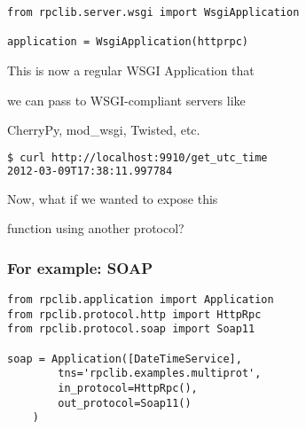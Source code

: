 \documentclass{beamer}
\begin{document}
\begin{frame}[fragile]
 \begin{lstlisting}
from rpclib.server.wsgi import WsgiApplication

application = WsgiApplication(httprpc)
 \end{lstlisting}

  \begin{center}
    This is now a regular WSGI Application that

    \bigskip

    we can pass to WSGI-compliant servers like

    \bigskip

    CherryPy, mod\_wsgi, Twisted, etc.
  \end{center}
  \pause
  \begin{lstlisting}[language=sh]
$ curl http://localhost:9910/get_utc_time
2012-03-09T17:38:11.997784
  \end{lstlisting}
\end{frame}

\begin{frame}
  \LARGE
  \begin{center}
    Now, what if we wanted to expose this

    \bigskip

    function using another protocol?
  \end{center}
\end{frame}

\begin{frame}[fragile]
  \frametitle{For example: SOAP}

  \begin{lstlisting}
from rpclib.application import Application
from rpclib.protocol.http import HttpRpc
from rpclib.protocol.soap import Soap11

soap = Application([DateTimeService],
        tns='rpclib.examples.multiprot',
        in_protocol=HttpRpc(),
        out_protocol=Soap11()
    )
  \end{lstlisting}
\end{frame}
\end{document}

